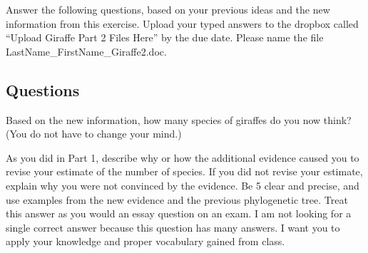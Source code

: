 \documentclass[11pt, addpoints]{exam}
\begin{document}
\newpage

Answer the following questions, based on your previous ideas and
the new information from this exercise. Upload your typed answers to the dropbox called “Upload Giraffe Part 2
Files Here” by the due date.  Please name the file LastName\_FirstName\_Giraffe2.doc.

\subsection*{Questions}

\begin{questions}

\question[1]
Based on the new information, how many species of giraffes do you now
think? (You do not have to change your mind.)

\question[10]
As you did in Part 1, describe why or how the additional evidence caused you to
revise your estimate of the number of species. If you did not revise
your estimate, explain why you were not convinced by the evidence. Be 5
clear and precise, and use examples from the new evidence and the previous phylogenetic tree.
Treat this answer as you would an essay question on an exam. I am not
looking for a single correct answer because this question has many answers. I
want you to apply your knowledge and proper vocabulary gained from
class. 

\end{questions}
\end{document}
